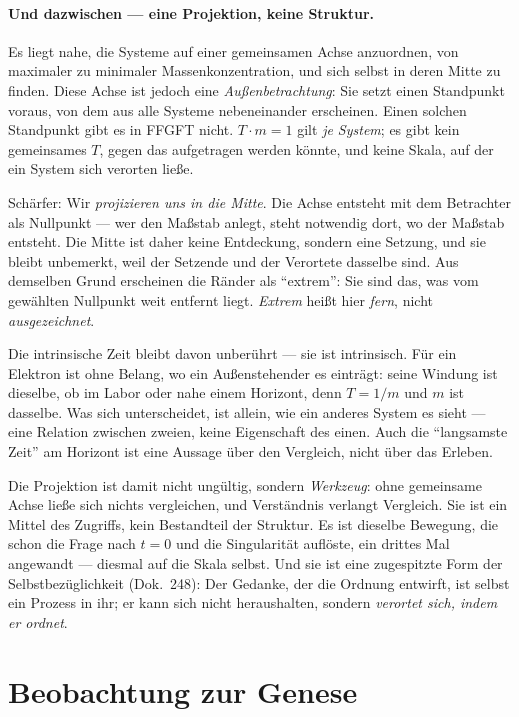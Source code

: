 \paragraph{Und dazwischen --- eine Projektion, keine Struktur.} Es liegt nahe, die Systeme auf
einer gemeinsamen Achse anzuordnen, von maximaler zu minimaler Massenkonzentration, und sich selbst
in deren Mitte zu finden. Diese Achse ist jedoch eine \emph{Außenbetrachtung}: Sie setzt einen
Standpunkt voraus, von dem aus alle Systeme nebeneinander erscheinen. Einen solchen Standpunkt gibt
es in FFGFT nicht. $T\cdot m = 1$ gilt \emph{je System}; es gibt kein gemeinsames $T$, gegen das
aufgetragen werden könnte, und keine Skala, auf der ein System sich verorten ließe.

Schärfer: Wir \emph{projizieren uns in die Mitte}. Die Achse entsteht mit dem Betrachter als
Nullpunkt --- wer den Maßstab anlegt, steht notwendig dort, wo der Maßstab entsteht. Die Mitte ist
daher keine Entdeckung, sondern eine Setzung, und sie bleibt unbemerkt, weil der Setzende und der
Verortete dasselbe sind. Aus demselben Grund erscheinen die Ränder als \enquote{extrem}: Sie sind
das, was vom gewählten Nullpunkt weit entfernt liegt. \emph{Extrem} heißt hier \emph{fern}, nicht
\emph{ausgezeichnet}.

Die intrinsische Zeit bleibt davon unberührt --- sie ist intrinsisch. Für ein Elektron ist ohne
Belang, wo ein Außenstehender es einträgt: seine Windung ist dieselbe, ob im Labor oder nahe einem
Horizont, denn $T = 1/m$ und $m$ ist dasselbe. Was sich unterscheidet, ist allein, wie ein anderes
System es sieht --- eine Relation zwischen zweien, keine Eigenschaft des einen. Auch die
\enquote{langsamste Zeit} am Horizont ist eine Aussage über den Vergleich, nicht über das Erleben.

Die Projektion ist damit nicht ungültig, sondern \emph{Werkzeug}: ohne gemeinsame Achse ließe sich
nichts vergleichen, und Verständnis verlangt Vergleich. Sie ist ein Mittel des Zugriffs, kein
Bestandteil der Struktur. Es ist dieselbe Bewegung, die schon die Frage nach $t=0$ und die
Singularität auflöste, ein drittes Mal angewandt --- diesmal auf die Skala selbst. Und sie ist eine
zugespitzte Form der Selbstbezüglichkeit (Dok.~248): Der Gedanke, der die Ordnung entwirft, ist selbst
ein Prozess in ihr; er kann sich nicht heraushalten, sondern \emph{verortet sich, indem er ordnet}.

\section{Beobachtung zur Genese}

